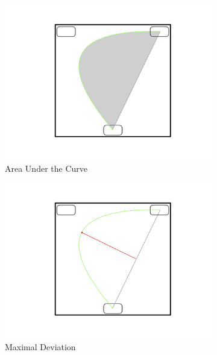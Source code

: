 \documentclass{article}
\begin{document}
\begin{figure}
\centering
\begin{subfigure}[b]{0.3\textwidth}
\includegraphics[width=\textwidth]{AUC.pdf}
\caption{Area Under the Curve}
\end{subfigure}
%
\begin{subfigure}[b]{0.3\textwidth}
\includegraphics[width=\textwidth]{MD.pdf}
\caption{Maximal Deviation}
\end{subfigure}
%
\begin{subfigure}[b]{0.3\textwidth}

\end{subfigure}
\end{figure}
\end{document}

